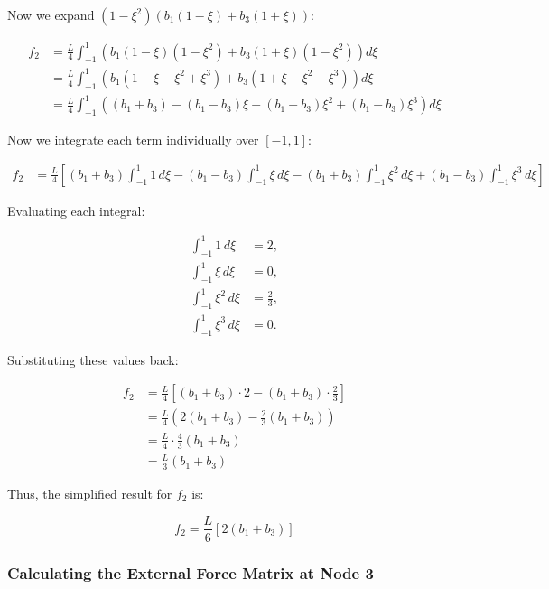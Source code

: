 \documentclass{article}
\begin{document}
Now we expand \( (1 - \xi^2)(b_1(1 - \xi) + b_3(1 + \xi)) \):

\begin{align*}
    f_2 &= \frac{L}{4} \int_{-1}^{1} \left( b_1(1 - \xi)(1 - \xi^2) + b_3(1 + \xi)(1 - \xi^2) \right) d\xi \\
    &= \frac{L}{4} \int_{-1}^{1} \left( b_1 (1 - \xi - \xi^2 + \xi^3) + b_3 (1 + \xi - \xi^2 - \xi^3) \right) d\xi \\
    &= \frac{L}{4} \int_{-1}^{1} \left( (b_1 + b_3) - (b_1 - b_3)\xi - (b_1 + b_3)\xi^2 + (b_1 - b_3)\xi^3 \right) d\xi
\end{align*}

Now we integrate each term individually over \([-1, 1]\):

\begin{align*}
    f_2 &= \frac{L}{4} \left[ (b_1 + b_3) \int_{-1}^{1} 1 \, d\xi - (b_1 - b_3) \int_{-1}^{1} \xi \, d\xi - (b_1 + b_3) \int_{-1}^{1} \xi^2 \, d\xi + (b_1 - b_3) \int_{-1}^{1} \xi^3 \, d\xi \right]
\end{align*}

Evaluating each integral:

\begin{align*}
    \int_{-1}^{1} 1 \, d\xi &= 2, \\
    \int_{-1}^{1} \xi \, d\xi &= 0, \\
    \int_{-1}^{1} \xi^2 \, d\xi &= \frac{2}{3}, \\
    \int_{-1}^{1} \xi^3 \, d\xi &= 0.
\end{align*}

Substituting these values back:

\begin{align*}
    f_2 &= \frac{L}{4} \left[ (b_1 + b_3) \cdot 2 - (b_1 + b_3) \cdot \frac{2}{3} \right] \\
    &= \frac{L}{4} \left( 2(b_1 + b_3) - \frac{2}{3}(b_1 + b_3) \right) \\
    &= \frac{L}{4} \cdot \frac{4}{3} (b_1 + b_3) \\
    &= \frac{L}{3} (b_1 + b_3)
\end{align*}

Thus, the simplified result for \( f_2 \) is:

\begin{equation}
    f_2 = \frac{L}{6} [2(b_1 + b_3)]
\end{equation}


\subsubsection*{Calculating the External Force Matrix at Node 3}
\end{document}
